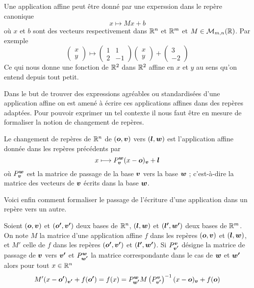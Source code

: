 \documentclass[11pt, a4paper]{article}
\begin{document}
\begin{exmp}
  Une application affine peut être donné par une experssion dans le
  repère canonique
  \[
  x \mapsto Mx + b
  \]
  où $x$ et $b$ sont des vecteurs respectivement dans $\mathbb{R}^n$ et $\mathbb{R}^m$
  et $M \in \mathcal{M}_{m, n}(\mathbb{R})$. Par exemple
  \[
  \begin{pmatrix} x \\ y \end{pmatrix} \mapsto \begin{pmatrix} 1 & 1
    \\ 2 & -1 \end{pmatrix}\begin{pmatrix} x \\ y \end{pmatrix}
  + \begin{pmatrix} 3 \\ -2 \end{pmatrix}
  \]
  Ce qui nous donne une fonction de $\mathbb{R}^2$ dans $\mathbb{R}^2$ affine en $x$
  et $y$ au sens qu'on entend depuis tout petit.
\end{exmp}
Dans le but de trouver des expressions agréables ou standardisées
d'une application affine on est amené à écrire ces applications
affines dans des repères adaptées. Pour pouvoir exprimer un tel
contexte il nous faut être en mesure de formaliser la notion
de changement de repères.
\begin{defn}
  Le changement de repères de $\mathbb{R}^n$ de $(\boldsymbol{o}, \boldsymbol{v})$ vers
  $(\boldsymbol{l}, \boldsymbol{w})$ est l'application affine donnée dans les repères
  précédents par
  \[
  x \longmapsto P_{\boldsymbol{v}}^{\boldsymbol{w}}(x - \boldsymbol{o})_{\boldsymbol{v}} + \boldsymbol{l}
  \]
  où $P_{\boldsymbol{v}}^{\boldsymbol{w}}$ est la matrice de passage de la base
  $\boldsymbol{v}$ vers la base $\boldsymbol{w}$ ; c'est-à-dire la matrice des
  vecteurs de $\boldsymbol{v}$ écrits dans la base $\boldsymbol{w}$.
\end{defn}
\noindent Voici enfin comment formaliser le passage de l'écriture
d'une application dans un repère vers un autre.
\begin{prop}
  Soient $(\boldsymbol{o}, \boldsymbol{v})$ et $(\boldsymbol{o'}, \boldsymbol{v'})$ deux bases de
  $\mathbb{R}^n$, $(\boldsymbol{l}, \boldsymbol{w})$ et $(\boldsymbol{l'}, \boldsymbol{w'})$ deux bases de
  $\mathbb{R}^m$. On note $M$ la matrice d'une application affine $f$ dans les
  repères $(\boldsymbol{o}, \boldsymbol{v})$ et $(\boldsymbol{l}, \boldsymbol{w})$, et $M'$ celle de
  $f$ dans les repères $(\boldsymbol{o'}, \boldsymbol{v'})$ et $(\boldsymbol{l'}, \boldsymbol{w'})$.
  Si $P_{\boldsymbol{v'}}^{\boldsymbol{v}}$ désigne la matrice de passage de $\boldsymbol{v}$
  vers $\boldsymbol{v'}$ et $P_{\boldsymbol{w'}}^{\boldsymbol{w}}$ la matrice correspondante
  dans le cas de $\boldsymbol{w}$ et $\boldsymbol{w'}$ alors pour tout $x \in \mathbb{R}^n$
  \[
  M'(x - \boldsymbol{o'})_{\boldsymbol{v'}} + f(\boldsymbol{o'}) = f(x) =
  P_{\boldsymbol{w'}}^{\boldsymbol{w}}M\left(P_{\boldsymbol{v'}}^{\boldsymbol{v}}\right)^{-1}(x -
  \boldsymbol{o})_{\boldsymbol{v}} + f(\boldsymbol{o})
  \]
\end{prop}
\end{document}
